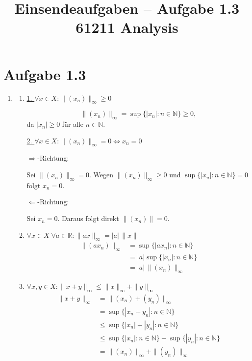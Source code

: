 \documentclass[a4paper,12pt]{article}
\title{Einsendeaufgaben -- Aufgabe 1.3\\[0.5em]
\large 61211 Analysis}
\author{}
\date{}
\begin{document}
\maketitle

\section*{Aufgabe 1.3}

\begin{enumerate}[label=\alph*)]

    \item
    \begin{enumerate}[label=(\roman*)]

        \item
        \underline{1. $\forall x \in X : \|(x_n)\|_\infty \geq 0$}

        \[
            \|(x_n)\|_\infty = \sup\{|x_n| : n \in \mathbb{N}\} \geq 0,
        \]
        da $|x_n| \geq 0$ für alle $n \in \mathbb{N}$.

        \underline{2. $\forall x \in X : \|(x_n)\|_\infty = 0 \Longleftrightarrow x_n = 0$}

        \glqq$\Rightarrow$\grqq-Richtung:

        Sei $\|(x_n)\|_\infty = 0$. Wegen $\|(x_n)\|_\infty \geq 0$
        und $\sup\{|x_n| : n \in \mathbb{N}\} = 0$ folgt $x_n = 0$.

        \glqq$\Leftarrow$\grqq-Richtung:

        Sei $x_n = 0$. Daraus folgt direkt $\|(x_n)\| = 0$.

        \item
        $\forall x \in X\; \forall a \in \mathbb{R} : \|ax\|_\infty = |a|\,\|x\|$
        \begin{align*}
            \|(ax_n)\|_\infty &= \sup\{|ax_n| : n \in \mathbb{N}\} \\
                              &= |a|\sup\{|x_n| : n \in \mathbb{N}\} \\
                              &= |a|\,\|(x_n)\|_\infty
        \end{align*}

        \item
        $\forall x, y \in X : \|x + y\|_\infty \leq \|x\|_\infty + \|y\|_\infty$
        \begin{align*}
            \|x + y\|_\infty &= \|(x_n) + (y_n)\|_\infty \\
                             &= \sup\{|x_n + y_n| : n \in \mathbb{N}\} \\
                             &\leq \sup\{|x_n| + |y_n| : n \in \mathbb{N}\} \\
                             &\leq \sup\{|x_n| : n \in \mathbb{N}\} + \sup\{|y_n| : n \in \mathbb{N}\} \\
                             &= \|(x_n)\|_\infty + \|(y_n)\|_\infty
        \end{align*}


\end{enumerate}
\end{enumerate}
\end{document}
